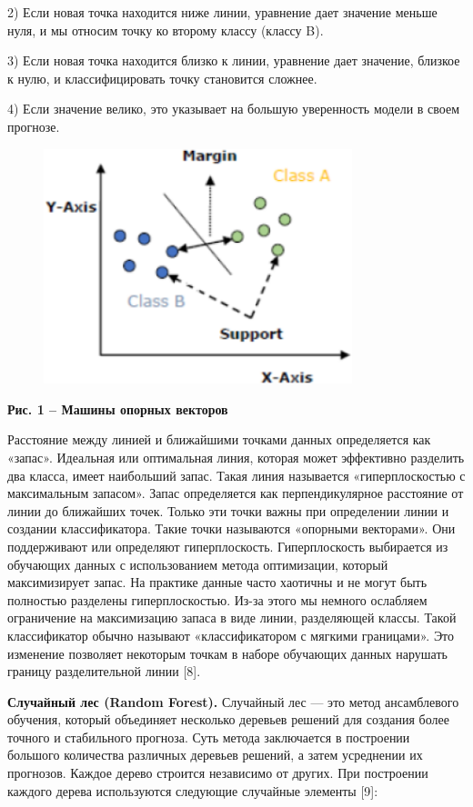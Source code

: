 2) Если новая точка находится ниже линии, уравнение дает значение меньше
нуля, и мы относим точку ко второму классу (классу B).

3) Если новая точка находится близко к линии, уравнение дает значение,
близкое к нулю, и классифицировать точку становится сложнее.

4) Если значение велико, это указывает на большую уверенность модели в
своем прогнозе.

\begin{figure}[H]
	\centering
	\includegraphics[width=0.8\textwidth]{assets/29}
	\caption*{}
\end{figure}

{\bfseries Рис. 1 -- Машины опорных векторов}

Расстояние между линией и ближайшими точками данных определяется как
«запас». Идеальная или оптимальная линия, которая может эффективно
разделить два класса, имеет наибольший запас. Такая линия называется
«гиперплоскостью с максимальным запасом». Запас определяется как
перпендикулярное расстояние от линии до ближайших точек. Только эти
точки важны при определении линии и создании классификатора. Такие точки
называются «опорными векторами». Они поддерживают или определяют
гиперплоскость. Гиперплоскость выбирается из обучающих данных с
использованием метода оптимизации, который максимизирует запас. На
практике данные часто хаотичны и не могут быть полностью разделены
гиперплоскостью. Из-за этого мы немного ослабляем ограничение на
максимизацию запаса в виде линии, разделяющей классы. Такой
классификатор обычно называют «классификатором с мягкими границами». Это
изменение позволяет некоторым точкам в наборе обучающих данных нарушать
границу разделительной линии {[}8{]}.

{\bfseries Случайный лес (Random Forest).} Случайный лес --- это метод
ансамблевого обучения, который объединяет несколько деревьев решений для
создания более точного и стабильного прогноза. Суть метода заключается в
построении большого количества различных деревьев решений, а затем
усреднении их прогнозов. Каждое дерево строится независимо от других.
При построении каждого дерева используются следующие случайные элементы
{[}9{]}:

